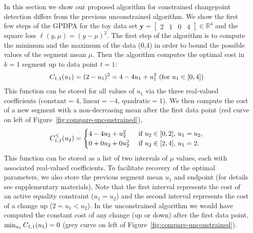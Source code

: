 \documentclass[twoside,11pt]{article}
\newcommand{\RR}{\mathbb R}
\begin{document}
In this section we show our proposed algorithm for constrained
changepoint detection differs from the previous unconstrained
algorithm. We show the first few steps of the GPDPA for the toy data
set $\mathbf y= \left[
\begin{array}{cccccc}
  2 & 1 & 0 & 4
\end{array}
\right] \in\RR^4$ and the square loss $\ell(y,\mu)=(y-\mu)^2$. The first
step of the algorithm is to compute the minimum and the maximum of the
data (0,4) in order to bound the possible values of the segment
mean $\mu$. Then the algorithm computes the optimal cost in $k=1$ segment up
to data point $t=1$:
\begin{equation}
  C_{1,1}(u_1) = (2-u_1)^2=4 - 4u_1 + u_1^2\text{ (for $u_1\in[0,4]$)}
\end{equation}
This function can be stored for all values of $u_1$ via the three
real-valued coefficients ($\text{constant}=4$, $\text{linear}=-4$,
$\text{quadratic}=1$). We then compute the cost of a new segment with
a non-decreasing mean after the first data point (red curve on left of
Figure~\ref{fig:compare-unconstrained}),
\begin{equation}
  C_{1,1}^\leq(u_2) =
  \begin{cases}
    4 - 4 u_2 + u_2^2 &\text{ if }u_2\in[0,2],\, u_1=u_2,\\
    0 + 0 u_2 + 0 u_2^2 & \text{ if }u_2\in[2,4],\,  u_1=2.
  \end{cases}
\end{equation}
This function can be stored as a list of two intervals of $\mu$
values, each with associated real-valued coefficients. To facilitate
recovery of the optimal parameters, we also store the previous segment
mean $u_1$ and endpoint (for details see supplementary
materials). Note that the first interval represents the cost of an
active equality constraint ($u_1=u_2$) and the second interval
represents the cost of a change up ($2=u_1<u_2$). In the unconstrained
algorithm we would have computed the constant cost of any change (up
or down) after the first data point, $\min_{u_1} C_{1,1}(u_1) =0$
(grey curve on left of Figure~\ref{fig:compare-unconstrained}).
\end{document}
